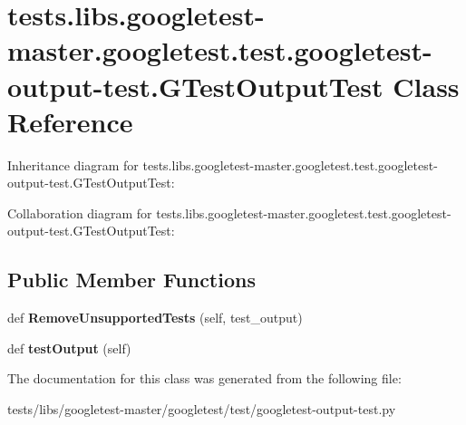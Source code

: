 \hypertarget{classtests_1_1libs_1_1googletest-master_1_1googletest_1_1test_1_1googletest-output-test_1_1GTestOutputTest}{}\section{tests.\+libs.\+googletest-\/master.googletest.\+test.\+googletest-\/output-\/test.G\+Test\+Output\+Test Class Reference}
\label{classtests_1_1libs_1_1googletest-master_1_1googletest_1_1test_1_1googletest-output-test_1_1GTestOutputTest}


Inheritance diagram for tests.\+libs.\+googletest-\/master.googletest.\+test.\+googletest-\/output-\/test.G\+Test\+Output\+Test\+:


Collaboration diagram for tests.\+libs.\+googletest-\/master.googletest.\+test.\+googletest-\/output-\/test.G\+Test\+Output\+Test\+:
\subsection*{Public Member Functions}
\begin{DoxyCompactItemize}
\item 
\mbox{\label{classtests_1_1libs_1_1googletest-master_1_1googletest_1_1test_1_1googletest-output-test_1_1GTestOutputTest_a6542f9179c791375b6271b3eabbeba0e}} 
def {\bfseries Remove\+Unsupported\+Tests} (self, test\+\_\+output)
\item 
\mbox{\label{classtests_1_1libs_1_1googletest-master_1_1googletest_1_1test_1_1googletest-output-test_1_1GTestOutputTest_a03c0f4636ab9a44f48d3d8a3ee933f74}} 
def {\bfseries test\+Output} (self)
\end{DoxyCompactItemize}


The documentation for this class was generated from the following file\+:\begin{DoxyCompactItemize}
\item 
tests/libs/googletest-\/master/googletest/test/googletest-\/output-\/test.\+py\end{DoxyCompactItemize}
